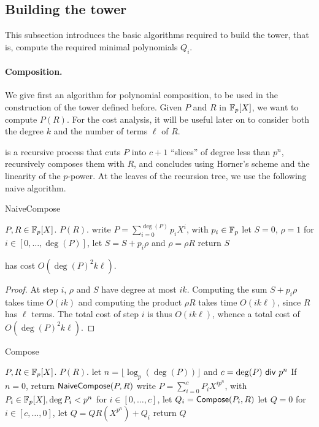 

\subsection{Building the tower}

This subsection introduces the basic algorithms required to build the
tower, that is, compute the required minimal polynomials $Q_i$.

\paragraph*{\bf Composition.} We give first an algorithm for
polynomial composition, to be used in the construction of the tower
defined before.  Given $P$ and $R$ in $\mathbb{F}_p[X]$, we want to compute
$P(R)$. For the cost analysis, it will be useful later on to consider
both the degree $k$ and the number of terms $\ell$ of $R$.

 is a recursive process that cuts $P$ into $c+1$
``slices'' of degree less than $p^n$, recursively composes them with
$R$, and concludes using Horner's scheme and the linearity of the
$p$-power. At the leaves of the recursion tree, we use the following naive
algorithm.

\begin{algorithm}
  \caption{NaiveCompose}
  \begin{algorithmic}[1]
    \REQUIRE $P,R\in\mathbb{F}_p[X]$.
    \ENSURE $P(R)$.
    \STATE write $P=\sum_{i=0}^{\deg(P)} p_i X^{i}$, with $p_i \in \mathbb{F}_p$
    \STATE let $S=0$, $\rho=1$
    \STATE for $i\in [0,\dots,\deg(P)]$, let $S=S+p_i \rho$ and $\rho =\rho R$
    \STATE return $S$
  \end{algorithmic}
\end{algorithm}

\begin{lemma}
   has cost $O(\deg(P)^2k\ell)$.  
\end{lemma}
\begin{proof} At step $i$, $\rho$ and $S$ have degree at most
$ik$. Computing the sum $S + p_i \rho$ takes time $O(ik)$ and
computing the product $\rho R$ takes time $O(ik\ell)$, since $R$ has
$\ell$ terms. The total cost of step $i$ is thus $O(ik\ell)$, 
whence a total cost of $O(\deg(P)^2 k\ell)$.
\end{proof}


\begin{algorithm}
  \caption{Compose}
  \begin{algorithmic}[1]
    \REQUIRE $P,R\in\mathbb{F}_p[X]$.
    \ENSURE $P(R)$.
    \STATE\label{c:params} let $n=\lfloor \log_p(\deg(P)) \rfloor$ and $c=\deg(P) {\sf~div~} p^n$
    \STATE If $n=0$, return ${\sf NaiveCompose}(P,R)$
    \STATE write $P=\sum_{i=0}^{c} P_i X^{ip^n}$, with $P_i \in \mathbb{F}_p[X], \deg P_i<p^n$
    \STATE for $i\in [0,\dots,c]$, let $Q_i = \text{{\sf Compose}}(P_i,R)$
    \STATE let $Q=0$
    \STATE\label{c:loop} for $i\in [c,\dots,0]$, let $Q = Q R(X^{p^n})  + Q_i$
    \STATE return $Q$
  \end{algorithmic}
\end{algorithm}

